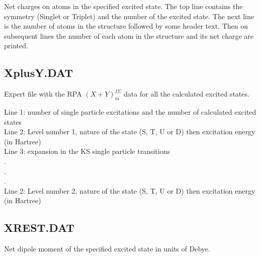Net charges on atoms in the specified excited state. The top line contains the
symmetry (Singlet or Triplet) and the number of the excited state. The next line
is the number of atoms in the structure followed by some header text. Then on
subsequent lines the number of each atom in the structure and its net charge are
printed.

\subsection{XplusY.DAT}

Expert file with the RPA  $(X+Y)^{I\Sigma}_{ia}$ data for all the calculated
excited states.

Line 1: number of single particle excitations and the number of calculated
excited states\\
Line 2: Level number 1, nature of the state (S, T, U or D) then excitation
energy (in Hartree)\\
Line 3: expansion in the KS single particle transitions\\
.\\
.\\
.\\
Line 2: Level number 2, nature of the state (S, T, U or D) then excitation
energy (in Hartree)\\

\subsection{XREST.DAT}

Net dipole moment of the specified excited state in units of Debye.

